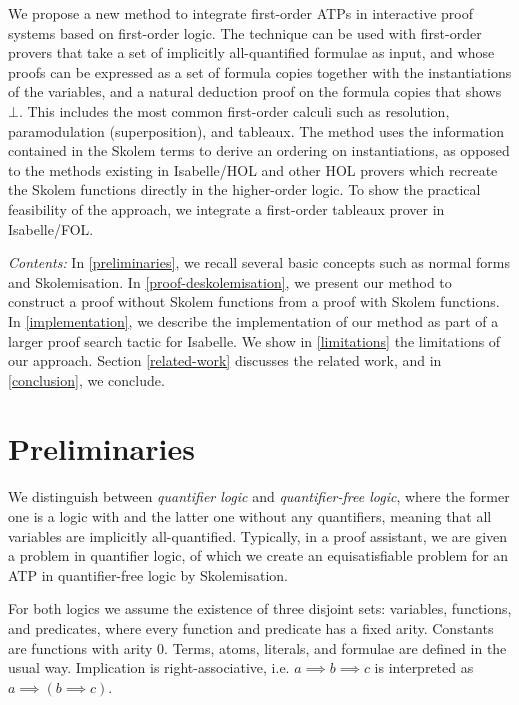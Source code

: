 \documentclass[]{article}
\begin{document}
We propose a new method to integrate first-order ATPs in interactive
proof systems based on first-order logic. The technique can be used with
first-order provers that take a set of implicitly all-quantified
formulae as input, and whose proofs can be expressed as a set of formula
copies together with the instantiations of the variables, and a natural
deduction proof on the formula copies that shows \(\bot\). This includes
the most common first-order calculi such as resolution, paramodulation
(superposition), and tableaux. The method uses the information contained
in the Skolem terms to derive an ordering on instantiations, as opposed
to the methods existing in Isabelle/HOL and other HOL provers which
recreate the Skolem functions directly in the higher-order logic. To
show the practical feasibility of the approach, we integrate a
first-order tableaux prover in Isabelle/FOL.

\emph{Contents:} In \autoref{preliminaries}, we recall several basic
concepts such as normal forms and Skolemisation. In
\autoref{proof-deskolemisation}, we present our method to construct a
proof without Skolem functions from a proof with Skolem functions. In
\autoref{implementation}, we describe the implementation of our method
as part of a larger proof search tactic for Isabelle. We show in
\autoref{limitations} the limitations of our approach. Section
\ref{related-work} discusses the related work, and in
\autoref{conclusion}, we conclude.

\section{Preliminaries}\label{preliminaries}

We distinguish between \emph{quantifier logic} and \emph{quantifier-free
logic}, where the former one is a logic with and the latter one without
any quantifiers, meaning that all variables are implicitly
all-quantified. Typically, in a proof assistant, we are given a problem
in quantifier logic, of which we create an equisatisfiable problem for
an ATP in quantifier-free logic by Skolemisation.

For both logics we assume the existence of three disjoint sets:
variables, functions, and predicates, where every function and predicate
has a fixed arity. Constants are functions with arity 0. Terms, atoms,
literals, and formulae are defined in the usual way. Implication is
right-associative, i.e. \(a \implies b \implies c\) is interpreted as
\(a \implies (b \implies c)\).
\end{document}
